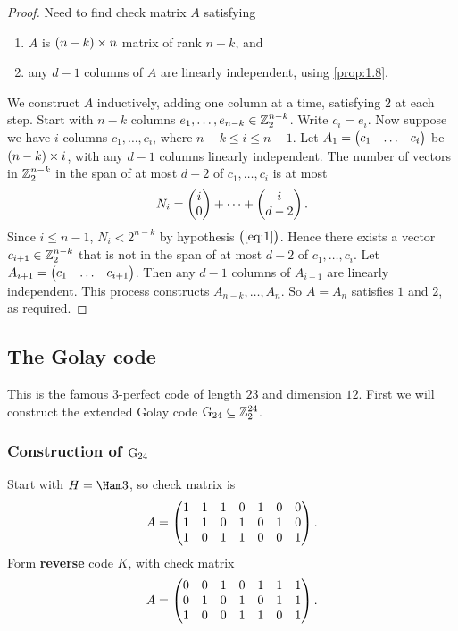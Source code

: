 \begin{proof}
Need to find check matrix $ A $ satisfying
\begin{enumerate}
\item $ A $ is $ \br{n - k} \times n $ matrix of rank $ n - k $, and
\item any $ d - 1 $ columns of $ A $ are linearly independent, using \ref{prop:1.8}.
\end{enumerate}
We construct $ A $ inductively, adding one column at a time, satisfying $ 2 $ at each step. Start with $ n - k $ columns $ e_1, \dots, e_{n - k} \in \mathbb{Z}_2^{n - k} $. Write $ c_i = e_i $. Now suppose we have $ i $ columns $ c_1, \dots, c_i $, where $ n - k \le i \le n - 1 $. Let $ A_1 = \onebythree{c_1}{\dots}{c_i} $ be $ \br{n - k} \times i $, with any $ d - 1 $ columns linearly independent. The number of vectors in $ \mathbb{Z}_2^{n - k} $ in the span of at most $ d - 2 $ of $ c_1, \dots, c_i $ is at most
$$ N_i = \begin{pmatrix} i \\ 0 \end{pmatrix} + \dots + \begin{pmatrix} i \\ d - 2 \end{pmatrix}. $$
Since $ i \le n - 1 $, $ N_i < 2^{n - k} $ by hypothesis $ \br{\ref{eq:1}} $. Hence there exists a vector $ c_{i + 1} \in \mathbb{Z}_2^{n - k} $ that is not in the span of at most $ d - 2 $ of $ c_1, \dots, c_i $. Let $ A_{i + 1} = \onebythree{c_1}{\dots}{c_{i + 1}} $. Then any $ d - 1 $ columns of $ A_{i + 1} $ are linearly independent. This process constructs $ A_{n - k}, \dots, A_n $. So $ A = A_n $ satisfies $ 1 $ and $ 2 $, as required.
\end{proof}

\subsection{The Golay code}


This is the famous $ 3 $-perfect code of length $ 23 $ and dimension $ 12 $. First we will construct the extended Golay code $ \mathrm{G}_{24} \subseteq \mathbb{Z}_2^{24} $.

\subsubsection{Construction of \texorpdfstring{$ \mathrm{G}_{24} $}{G24}}

Start with $ H = \Ham 3 $, so check matrix is
$$ A = \begin{pmatrix} 1 & 1 & 1 & 0 & 1 & 0 & 0 \\ 1 & 1 & 0 & 1 & 0 & 1 & 0 \\ 1 & 0 & 1 & 1 & 0 & 0 & 1 \end{pmatrix}. $$
Form \textbf{reverse} code $ K $, with check matrix
$$ A = \begin{pmatrix} 0 & 0 & 1 & 0 & 1 & 1 & 1 \\ 0 & 1 & 0 & 1 & 0 & 1 & 1 \\ 1 & 0 & 0 & 1 & 1 & 0 & 1 \end{pmatrix}. $$

